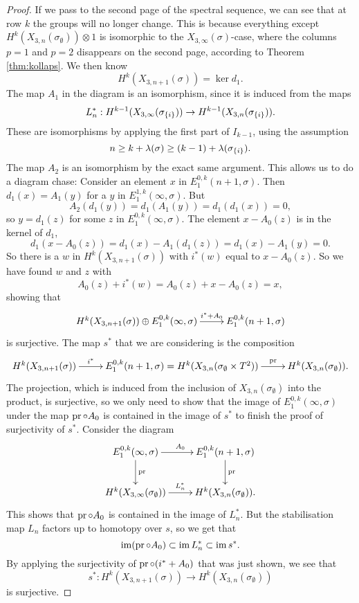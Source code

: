 \begin{proof}
  If we pass to the second page of the spectral sequence, we
  can see that at row $k$ the groups will no longer change. This is
  because everything except $H^k(X_{3,n}(\sigma_{\emptyset}))\otimes 1$ is
  isomorphic to the $X_{3,\infty}(\sigma)$-case, where the columns $p=1$
  and $p=2$ disappears on the second page, according to Theorem
  \ref{thm:kollaps}. We then know
  \[ H^k(X_{3,n+1}(\sigma)) = \ker d_1. \]
  The map $A_1$ in the diagram is an isomorphism, since it is induced
  from the maps
  \[ L^*_{n} : H^{k-1}(X_{3,\infty}(\sigma_{\left\{ i \right\}})) \to
  H^{k-1}(X_{3,n}(\sigma_{\left\{ i \right\}})). \]
  These are isomorphisms by applying the first part of $I_{k-1}$,
  using the assumption 
  \[ n \geq k+\lambda(\sigma) \geq
  (k-1)+\lambda(\sigma_{\left\{ i \right\}}). \]
  The map $A_2$ is an isomorphism by the exact same argument.
  This allows us to do a diagram chase: Consider an element $x$ in
  $E_1^{0,k}(n+1,\sigma)$. Then $d_1(x) = A_1(y)$ for a $y$ in
  $E_1^{1,k}(\infty,\sigma)$. But 
  \[ A_2(d_1(y)) = d_1(A_1(y)) = d_1(d_1(x)) = 0, \]
  so $y = d_1(z)$ for some $z$ in $E_1^{0,k}(\infty,\sigma)$. The
  element $x - A_0(z)$ is in the kernel of $d_1$,
  \[ d_1(x - A_0(z)) = d_1(x) - A_1(d_1(z)) = d_1(x) - A_1(y) = 0. \]
  So there is a $w$ in $H^k(X_{3,n+1}(\sigma))$ with $i^*(w)$ equal to
  $x-A_0(z)$. So we have found $w$ and $z$ with
  \[ A_0(z) + i^*(w) = A_0(z) + x - A_0(z) = x, \]
  showing that
  \[ \xymatrix{ H^k(X_{3,n+1}(\sigma)) \oplus E_1^{0,k}(\infty,\sigma)
    \ar[r]^-{i^* + A_0} & E_1^{0,k}(n+1,\sigma) } \]
  is surjective. The map $s^*$ that we are considering is the
  composition
  \[ \xymatrix{ H^k(X_{3,n+1}(\sigma)) \ar[r]^-{i^*} &
    E_1^{0,k}(n+1,\sigma) = H^k(X_{3,n}(\sigma_{\emptyset}\times T^2))
    \ar[r]^-{\pr} & H^k(X_{3,n}(\sigma_{\emptyset})). } \]
  The projection, which is induced from the inclusion of
  $X_{3,n}(\sigma_{\emptyset})$ into the product, is surjective, so we
  only need to show that the image of
  $E_1^{0,k}(\infty,\sigma)$ under the map $\operatorname{pr}\circ A_0$ is contained
  in the image of $s^*$ to
  finish the proof of surjectivity of $s^*$. Consider the diagram
  \[ \xymatrix{ E_1^{0,k}(\infty,\sigma) \ar[r]^{A_0} \ar[d]^{\pr}
    & E_1^{0,k}(n+1,\sigma) \ar[d]^{\pr} \\
    H^k(X_{3,\infty}(\sigma_{\emptyset})) \ar[r]^{L_n^*} &
    H^k(X_{3,n}(\sigma_{\emptyset})). } \]
  This shows that $\operatorname{pr}\circ A_0$ is contained in the image of
  $L_n^*$. But the stabilisation map $L_n$ factors up to homotopy over
  $s$, so we get that
  \[ \operatorname{im}(\operatorname{pr}\circ A_0) \subset \operatorname{im} L_n^* \subset \operatorname{im} s^*. \]
  By applying the surjectivity of $\operatorname{pr}\circ (i^*+A_0)$ that was just
  shown, we see that
  \[  s^* : H^k(X_{3,n+1}(\sigma)) \to
  H^k(X_{3,n}(\sigma_{\emptyset})) \] 
  is surjective.
  

\end{proof}
